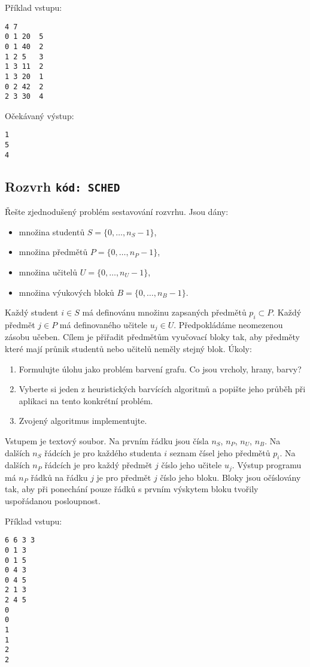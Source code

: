 \documentclass[a4paper,10pt]{article}
\begin{document}
Příklad vstupu:
\begin{verbatim}
4 7
0 1 20  5
0 1 40  2
1 2 5   3
1 3 11  2
1 3 20  1
0 2 42  2 
2 3 30  4
\end{verbatim}


Očekávaný výstup:
\begin{verbatim}
1
5
4
\end{verbatim}


\subsection{Rozvrh \hfill{\tt kód: SCHED}}
Řešte zjednodušený problém sestavování rozvrhu. Jsou dány:
\begin{itemize}
 \item množina studentů $S=\{0,\dots, n_S - 1\}$, 
 \item množina předmětů $P=\{0,\dots, n_P - 1\}$,
 \item množina učitelů  $U=\{0,\dots, n_U - 1\}$, 
 \item množina výukových bloků $B=\{0,\dots, n_B - 1\}$. 
\end{itemize}
Každý student $i\in S$ má definovánu množinu zapsaných předmětů $p_i \subset P$. 
Každý předmět $j\in P$ má definovaného učitele $u_j \in U$. Předpokládáme neomezenou zásobu učeben.
Cílem je přiřadit předmětům vyučovací bloky tak, aby předměty které mají průnik studentů nebo učitelů
neměly stejný blok.
Úkoly:
\begin{enumerate} 
 \item Formulujte úlohu jako problém barvení grafu. Co jsou vrcholy, hrany, barvy?
 \item Vyberte si jeden z heuristických barvících algoritmů a popište jeho průběh při aplikaci na tento konkrétní problém.
 \item Zvojený algoritmus implementujte.
\end{enumerate}

Vstupem je textový soubor. Na prvním řádku jsou čísla $n_S$, $n_P$, $n_U$, $n_B$.
Na dalších $n_S$ řádcích je pro každého studenta $i$ seznam čísel jeho předmětů $p_i$. 
Na dalších $n_P$ řádcích je pro každý předmět $j$ číslo jeho učitele $u_j$.
Výstup programu má $n_P$ řádků na řádku $j$ je pro předmět $j$ číslo jeho bloku. 
Bloky jsou očíslovány tak, aby při ponechání pouze řádků s prvním výskytem bloku
tvořily uspořádanou posloupnost.

Příklad vstupu:
\begin{verbatim}
6 6 3 3
0 1 3
0 1 5
0 4 3
0 4 5
2 1 3
2 4 5
0
0
1
1
2
2
\end{verbatim}
\end{document}
